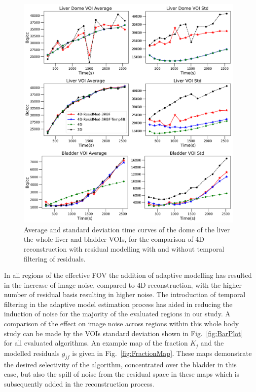 \begin{figure} [!htbp]
\centering
\includegraphics[scale=0.82 ,angle=0]{3_Results/3_4_Residual/figures/TACsFilt.png}
\caption{Average and standard deviation time curves of the dome of the liver the whole liver and bladder VOIs, for the comparison of 4D reconstruction with residual modelling with and without temporal filtering of residuals.} 
\label{fig:TACsFilt}
\end{figure}

In all regions of the effective FOV the addition of adaptive modelling has resulted in the increase of image noise, compared to 4D reconstruction, with the higher number of residual basis resulting in higher noise. The introduction of temporal filtering in the adaptive model estimation process has aided in reducing the induction of noise for the majority of the evaluated regions in our study. 
A comparison of the effect on image noise across regions within this whole body study can be made by the VOIs standard deviation shown in Fig.~\ref{fig:BarPlot} for all evaluated algorithms.
An example map of the fraction $K_{j}$ and the modelled residuals $g_{jf}$ is given in Fig.~\ref{fig:FractionMap}. These maps demonstrate the desired selectivity of the algorithm, concentrated over the bladder in this case, but also the
spill of noise from the residual space in these maps which is subsequently added in the reconstruction process.

